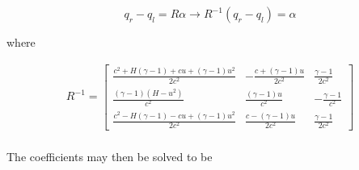 \documentclass{article}%
\numberwithin{equation}{section}
\begin{document}
\begin{equation}
q_r - q_l = R \alpha \rightarrow R^{-1} (q_r - q_l) = \alpha \label{alphaeqn}
\end{equation}

where 

\begin{equation}
\begin{split}
R^{-1} = \left[ \begin{array}{ccc} \frac{c^2 + H (\gamma-1) + c u + (\gamma-1) u^2}{2 c^2} & -\frac{c + (\gamma - 1) u}{2 c^2} & \frac{\gamma - 1}{2 c^2} \\ \frac{ (\gamma - 1) (H - u^2)}{c^2} & \frac{(\gamma - 1) u}{c^2} & - \frac{\gamma - 1}{c^2} \\   \frac{c^2 - H (\gamma - 1) - c u + (\gamma - 1) u^2}{2 c^2} & \frac{c - (\gamma - 1) u}{2 c^2} & \frac{\gamma - 1}{2 c^2} \end{array} \right] \\ 
\end{split}
\end{equation}


The coefficients may then be solved to be
\end{document}

